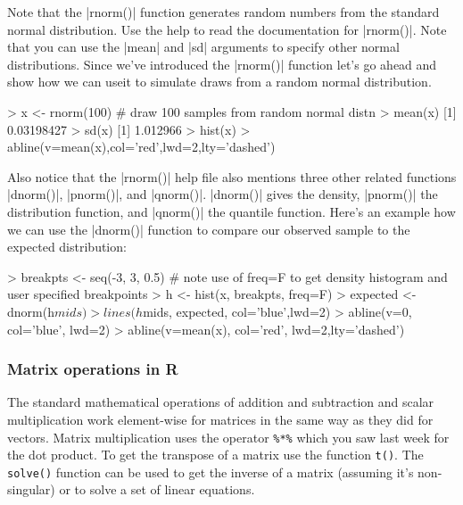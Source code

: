 Note that the |rnorm()| function generates random numbers from the standard normal distribution. Use the help to read the documentation for |rnorm()|. Note that you can use the |mean| and |sd| arguments to specify other normal distributions.  Since we've introduced the |rnorm()| function let's go ahead and show how we can useit to simulate draws from a random normal distribution.
%
\begin{R}
> x <- rnorm(100) # draw 100 samples from random normal distn
> mean(x)
[1] 0.03198427
> sd(x)
[1] 1.012966
> hist(x)
> abline(v=mean(x),col='red',lwd=2,lty='dashed')
\end{R}
%
Also notice that the |rnorm()| help file also mentions three other related functions |dnorm()|, |pnorm()|, and |qnorm()|. |dnorm()| gives the density, |pnorm()| the distribution function, and |qnorm()| the quantile function. Here's an example how we can use the |dnorm()| function to compare our observed sample to the expected distribution:
%
\begin{R}
> breakpts <- seq(-3, 3, 0.5)
# note use of freq=F to get density histogram  and user specified breakpoints
> h <- hist(x, breakpts, freq=F)
> expected <- dnorm(h$mids)
> lines(h$mids, expected, col='blue',lwd=2)
> abline(v=0, col='blue', lwd=2)
> abline(v=mean(x), col='red', lwd=2,lty='dashed')
\end{R}
%

\subsubsection{Matrix operations in R}

The standard mathematical operations of addition and subtraction and
scalar multiplication work element-wise for matrices in the same way as
they did for vectors. Matrix multiplication uses the operator
\lstinline!%*%! which you saw last week for the dot product. To get the
transpose of a matrix use the function \lstinline!t()!. The
\lstinline!solve()! function can be used to get the inverse of a matrix
(assuming it's non-singular) or to solve a set of linear equations.

